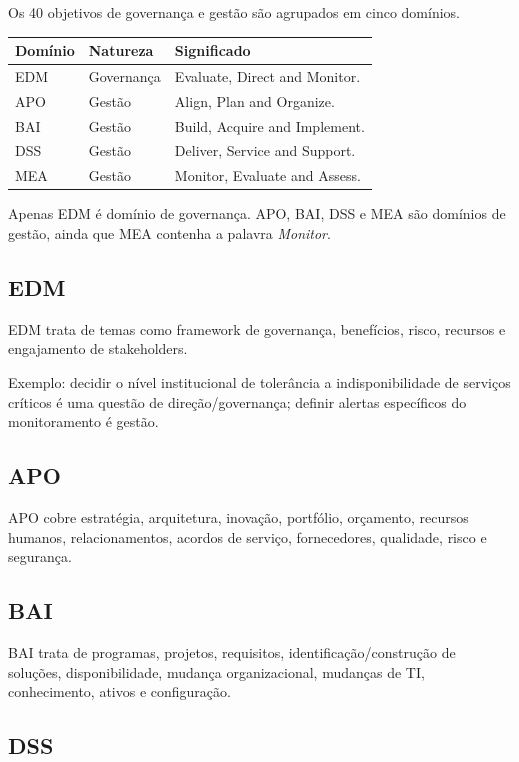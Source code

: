 Os 40 objetivos de governança e gestão são agrupados em cinco domínios.

\begin{table}[ht]
\centering
\small
\begin{tabularx}{\textwidth}{l l X}
\toprule
Domínio & Natureza & Significado \\
\midrule
EDM & Governança & Evaluate, Direct and Monitor. \\
APO & Gestão & Align, Plan and Organize. \\
BAI & Gestão & Build, Acquire and Implement. \\
DSS & Gestão & Deliver, Service and Support. \\
MEA & Gestão & Monitor, Evaluate and Assess. \\
\bottomrule
\end{tabularx}
\end{table}

Apenas EDM é domínio de governança. APO, BAI, DSS e MEA são domínios de gestão, ainda que MEA contenha a palavra \emph{Monitor}.

\subsection{EDM}

EDM trata de temas como framework de governança, benefícios, risco, recursos e engajamento de stakeholders.

Exemplo: decidir o nível institucional de tolerância a indisponibilidade de serviços críticos é uma questão de direção/governança; definir alertas específicos do monitoramento é gestão.

\subsection{APO}

APO cobre estratégia, arquitetura, inovação, portfólio, orçamento, recursos humanos, relacionamentos, acordos de serviço, fornecedores, qualidade, risco e segurança.

\subsection{BAI}

BAI trata de programas, projetos, requisitos, identificação/construção de soluções, disponibilidade, mudança organizacional, mudanças de TI, conhecimento, ativos e configuração.

\subsection{DSS}

